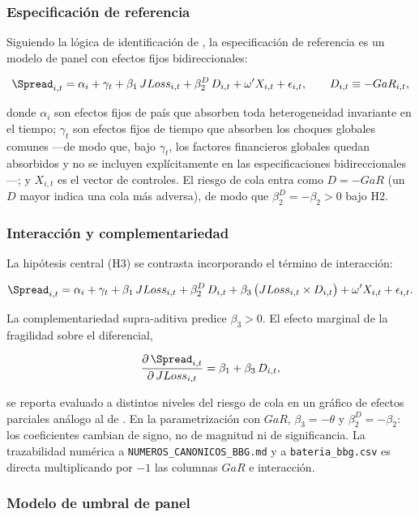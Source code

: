 \subsubsection{Especificación de referencia}

Siguiendo la lógica de identificación de \citet{Chari2024b}, la especificación de referencia es un modelo de panel con efectos fijos bidireccionales:

\[ \Spread_{i,t} = \alpha_i + \gamma_t + \beta_1\,JLoss_{i,t} + \beta_2^{D}\,D_{i,t} + \omega'X_{i,t} + \epsilon_{i,t}, \qquad D_{i,t}\equiv-GaR_{i,t}, \]

donde $\alpha_i$ son efectos fijos de país que absorben toda heterogeneidad invariante en el tiempo; $\gamma_t$ son efectos fijos de tiempo que absorben los choques globales comunes —de modo que, bajo $\gamma_t$, los factores financieros globales quedan absorbidos y no se incluyen explícitamente en las especificaciones bidireccionales—; y $X_{i,t}$ es el vector de controles. El riesgo de cola entra como $D=-GaR$ (un $D$ mayor indica una cola más adversa), de modo que $\beta_2^{D}=-\beta_2>0$ bajo H2.

\subsubsection{Interacción y complementariedad}

La hipótesis central (H3) se contrasta incorporando el término de interacción:

\[ \Spread_{i,t} = \alpha_i + \gamma_t + \beta_1\,JLoss_{i,t} + \beta_2^{D}\,D_{i,t} + \beta_3\,\bigl(JLoss_{i,t}\times D_{i,t}\bigr) + \omega'X_{i,t} + \epsilon_{i,t}. \]

La complementariedad supra-aditiva predice $\beta_3 > 0$. El efecto marginal de la fragilidad sobre el diferencial,

\[ \frac{\partial\,\Spread_{i,t}}{\partial\,JLoss_{i,t}} = \beta_1 + \beta_3\,D_{i,t}, \]

se reporta evaluado a distintos niveles del riesgo de cola en un gráfico de efectos parciales análogo al de \citet{Chari2024b}. En la parametrización con $GaR$, $\beta_3=-\theta$ y $\beta_2^{D}=-\beta_2$: los coeficientes cambian de signo, no de magnitud ni de significancia. La trazabilidad numérica a \texttt{NUMEROS\_CANONICOS\_BBG.md} y a \texttt{bateria\_bbg.csv} es directa multiplicando por $-1$ las columnas $GaR$ e interacción.

\subsubsection{Modelo de umbral de panel}

